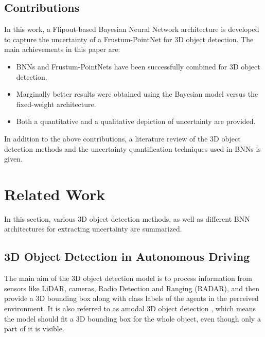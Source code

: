 \documentclass[10pt,twocolumn,letterpaper]{article}
\begin{document}
\subsection{Contributions}
In this work, a Flipout-based Bayesian Neural Network \cite{Wen2018} architecture is developed to capture the uncertainty of a Frustum-PointNet for 3D object detection. The main achievements in this paper are: 
\begin{itemize}
    \item BNNs and Frustum-PointNets have been successfully combined for 3D object detection.
    \item Marginally better results were obtained using the Bayesian model versus the fixed-weight architecture.
    \item Both a quantitative and a qualitative depiction of uncertainty are provided.
\end{itemize}
    
    In addition to the above contributions, a literature review of the 3D object detection methods and the uncertainty quantification techniques used in BNNs is given.
\section{Related Work}
In this section, various 3D object detection methods, as well as different BNN architectures for extracting uncertainty are summarized.

\subsection{3D Object Detection in Autonomous Driving}
The main aim of the 3D object detection model is to process information from sensors like LiDAR, cameras, Radio Detection and Ranging (RADAR), and then provide a 3D bounding box along with class labels of the agents in the perceived environment. It is also referred to as amodal 3D object detection \cite{Arnold2019}, which means the model should fit a 3D bounding box for the whole object, even though only a part of it is visible.

\end{document}
